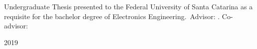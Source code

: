 \begin{titlepage}
  \begin{center}
    {\large \MakeUppercase{\theauthor}}
  \end{center}

  \vfill

  \begin{center}
    {\Large \bfseries \MakeUppercase{\thetitle}}
  \end{center}
  \begin{flushright}
  	\begin{minipage}{0.5\textwidth}
     Undergraduate Thesis presented to the Federal University of Santa
     Catarina as a requisite for the bachelor degree of Electronics 
     Engineering.\ Advisor: \theadvisor. Co-advisor: \thecoadvisor
  	\end{minipage}
  \end{flushright}
  

  \vfill

  \begin{center}
    {\large \bfseries \MakeUppercase{\theplace} \par 2019}
  \end{center}
\end{titlepage}
